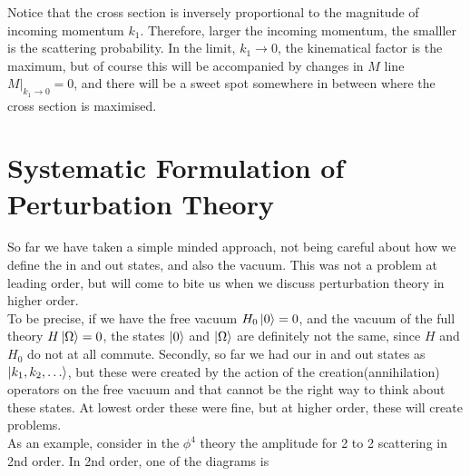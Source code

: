 \documentclass[11pt, notitlepage]{report}
\numberwithin{equation}{section}
\begin{document}
Notice that the cross section is inversely proportional to the magnitude of incoming momentum \(k_1\). Therefore, larger the incoming momentum, the smalller is the scattering probability. In the limit, \(k_1\to0\), the kinematical factor is the maximum, but of course this will be accompanied by changes in \(M\) line \(M|_{k_1\to 0} =  0\), and there will be a sweet spot somewhere in between where the cross section is maximised.

\newpage
\section{Systematic Formulation of Perturbation Theory}
So far we have taken a simple minded approach, not being careful about how we define the in and out states, and also the vacuum. This was not a problem at leading order, but will come to bite us when we discuss perturbation theory in higher order. \\

To be precise, if we have the free vacuum \(H_0\ket{0} = 0\), and the vacuum of the full theory \(H\ket{\Omega} = 0\), the states \(\ket{0}\) and \(\ket{\Omega}\) are definitely not the same, since \(H\) and \(H_0\) do not at all commute. Secondly, so far we had our in and out states as \(\ket{k_1, k_2, \ldots}\), but these were created by the action of the creation(annihilation) operators on the free vacuum and that cannot be the right way to think about these states. At lowest order these were fine, but at higher order, these will create problems. \\
As an example, consider in the \(\phi^4\) theory the amplitude for 2 to 2 scattering in 2nd order. In 2nd order, one of the diagrams is 
\begin{figure}[h]
    \centering
\end{figure}
\end{document}
